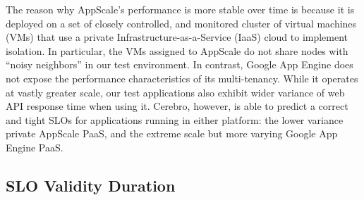 The reason why AppScale's performance is more stable over time is because it is
deployed on a set of closely controlled, 
and monitored cluster of virtual machines (VMs) that use a private
Infrastructure-as-a-Service (IaaS) cloud to implement isolation.  In particular, the 
VMs assigned to AppScale do not share nodes with ``noisy neighbors'' in our
test environment.  In contrast, Google App Engine does not expose the
performance characteristics of its multi-tenancy.  While it operates at vastly
greater scale, our test applications also exhibit wider variance of web API
response time when using it.
Cerebro, however, is able to predict a correct and tight SLOs for applications
running in either platform: the lower variance private
AppScale PaaS, and the extreme scale but more varying Google App Engine PaaS.

\subsection{SLO Validity Duration}

%

